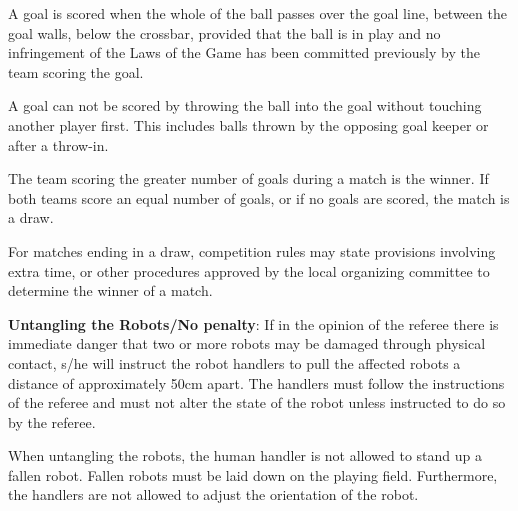 \documentclass[12pt]{hurocup}
\begin{document}
\begin{lawlist}[US]
  
\item A goal is scored when the whole of the ball passes over the goal
  line, between the goal walls, below the crossbar, provided that the
  ball is in play and no infringement of the Laws of the Game has been
  committed previously by the team scoring the goal. 

\item A goal can not be scored by throwing the ball into the
  goal without touching another player first. This includes balls
  thrown by the opposing goal keeper or after a throw-in.
  
\item The team scoring the greater number of goals during a match is
  the winner. If both teams score an equal number of goals, or if no
  goals are scored, the match is a draw.
  
\item For matches ending in a draw, competition rules may state
  provisions involving extra time, or other procedures approved by the
  local organizing committee to determine the winner of a match.
\end{lawlist}


\begin{lawlist}[US]
\item \textbf{Untangling the Robots/No penalty}: If in the opinion of
  the referee there is immediate danger that two or more robots may be
  damaged through physical contact, s/he will instruct the robot
  handlers to pull the affected robots a distance of approximately
  50cm apart. The handlers must follow the instructions of the referee
  and must not alter the state of the robot unless instructed to do so
  by the referee.

\end{lawlist}

\begin{decisions}
\item When untangling the robots, the human handler is not allowed to
  stand up a fallen robot. Fallen robots must be laid down on the
  playing field. Furthermore, the handlers are not allowed to adjust
  the orientation of the robot.
\end{decisions}

\label{law:cautionable}
\end{document}
